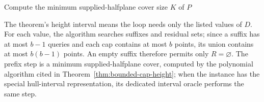 \begin{algorithm}[H]
\caption{Exact maximum depth with a distinguished miss hypothesis and bounded caps}
\label{alg:bounded-caps}
Compute the minimum supplied-halfplane cover size $K$ of $P$\;
\end{algorithm}

The theorem's height interval means the loop needs only the listed
values of $D$. For each value, the algorithm searches suffixes and
residual sets; since a suffix has at most $b-1$ queries and each cap
contains at most $b$ points, its union contains at most $b(b-1)$
points. An empty suffix therefore permits only $R=\varnothing$. The
prefix step is a minimum supplied-halfplane cover, computed by the
polynomial algorithm cited in Theorem~\ref{thm:bounded-cap-height};
when the instance has the special hull-interval representation, its
dedicated interval oracle performs the same step.
